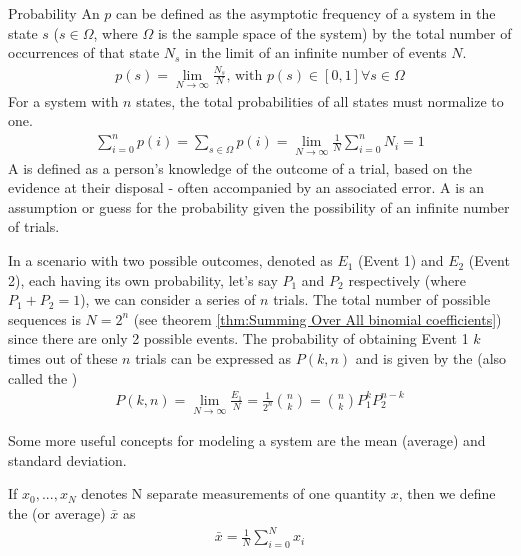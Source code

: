 \begin{defn}{Probability}
An  $p$ can be defined as the asymptotic frequency of a system in the state $s$ ($s \in \Omega$, where $\Omega$ is the sample space of the system) by the total number of occurrences of that state $N_s$ in the limit of an infinite number of events $N$.
    \begin{align}
        p(s) = \lim_{N\rightarrow\infty}\frac{N_s}{N} \text{, with } p(s) \in [0,1] \forall s \in \Omega
    \end{align}
For a system with $n$ states, the total probabilities of all states must normalize to one.
    \begin{align}
        \sum_{i=0}^{n}p(i) = \sum_{s \in \Omega}p(i) = \lim_{N\rightarrow\infty}\frac{1}{N}\sum_{i=0}^{n}N_i = 1
    \end{align}
A  is defined as a person's knowledge of the outcome of a trial, based on the evidence at their disposal - often accompanied by an associated error. A  is an assumption or guess for the probability given the possibility of an infinite number of trials.
\end{defn}

In a scenario with two possible outcomes, denoted as $E_1$ (Event 1) and $E_2$ (Event 2), each having its own probability, let's say $P_1$ and $P_2$ respectively (where $P_1 + P_2 = 1$), we can consider a series of $n$ trials. The total number of possible sequences is $N=2^n$ (see theorem \ref{thm:Summing Over All binomial coefficients}) since there are only 2 possible events. The probability of obtaining Event 1 $k$ times out of these $n$ trials can be expressed as $P(k, n)$ and is given by the  (also called the )
\begin{align}
P(k,n) = \lim_{N\rightarrow\infty}\frac{E_1}{N} = \frac{1}{2^n}{{n}\choose{k}} = {{n}\choose{k}}P_1^kP_2^{n-k}
\end{align}

Some more useful concepts for modeling a system are the mean (average) and standard deviation. 

\begin{defn}{1}
	If $x_0, ..., x_N$ denotes N separate measurements of one quantity $x$, then we define the  (or average) $\bar{x}$ as
	\begin{align}
		\bar{x} = \frac{1}{N}\sum_{i=0}^{N}x_i \label{mean equation}
	\end{align}
\end{defn}


